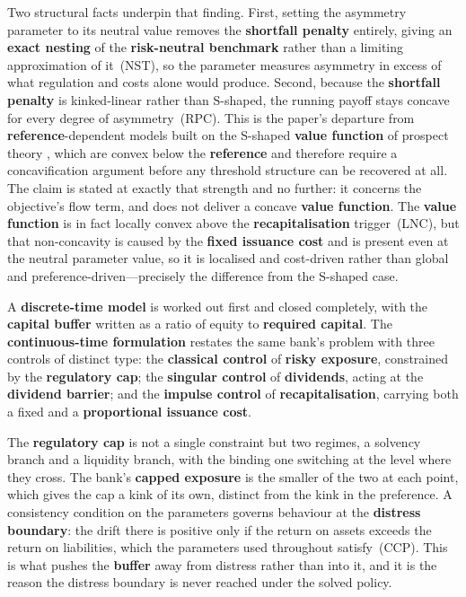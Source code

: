 \documentclass[11pt]{article}
\begin{document}
Two structural facts underpin that finding. First, setting the asymmetry
parameter to its neutral value removes the \textbf{shortfall penalty} entirely,
giving an \textbf{exact nesting} of the \textbf{risk-neutral benchmark} rather than a
limiting approximation of it~(NST), so the parameter measures asymmetry in
excess of what regulation and costs alone would produce. Second, because
the \textbf{shortfall penalty} is kinked-linear rather than S-shaped, the running
payoff stays concave for every degree of asymmetry~(RPC). This is the
paper's departure from \textbf{reference}-dependent models built on the S-shaped
\textbf{value function} of prospect theory \citep{kahneman1979}, which are convex
below the \textbf{reference} and therefore require a concavification argument
before any threshold structure can be recovered at all. The claim is
stated at exactly that strength and no further: it concerns the
objective's flow term, and does not deliver a concave \textbf{value function}. The
\textbf{value function} is in fact locally convex above the \textbf{recapitalisation}
trigger~(LNC), but that non-concavity is caused by the \textbf{fixed issuance cost}
and is present even at the neutral parameter value, so it is localised and
cost-driven rather than global and preference-driven---precisely the
difference from the S-shaped case.

A \textbf{discrete-time model} is worked out first and closed completely, with the
\textbf{capital buffer} written as a ratio of equity to \textbf{required capital}. The
\textbf{continuous-time formulation} restates the same bank's problem with three
controls of distinct type: the \textbf{classical control} of \textbf{risky exposure},
constrained by the \textbf{regulatory cap}; the \textbf{singular control} of \textbf{dividends},
acting at the \textbf{dividend barrier}; and the \textbf{impulse control} of
\textbf{recapitalisation}, carrying both a fixed and a \textbf{proportional issuance cost}.

The \textbf{regulatory cap} is not a single constraint but two regimes, a solvency
branch and a liquidity branch, with the binding one switching at the level
where they cross. The bank's \textbf{capped exposure} is the smaller of the two at
each point, which gives the cap a kink of its own, distinct from the kink
in the preference. A consistency condition on the parameters governs
behaviour at the \textbf{distress boundary}: the drift there is positive only if
the return on assets exceeds the return on liabilities, which the
parameters used throughout satisfy~(CCP). This is what pushes the \textbf{buffer}
away from distress rather than into it, and it is the reason the distress
boundary is never reached under the solved policy.
\end{document}
